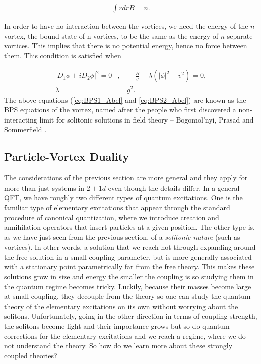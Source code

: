     \begin{align}
        \int r dr B = n.
    \end{align}

    In order to have no interaction between the vortices, we need the energy of the $n$ vortex, the bound state of n vortices, to be the same as the energy of $n$ separate vortices. This implies that there is no potential energy, hence no force between them. This condition is satisfied when

    \begin{align}
        |D_1\phi \pm i D_2 \phi|^2 =0&,  \qquad \frac{B}{g} \pm \lambda \left(|\phi|^2 -v^2  \right) =0, \label{eq:BPS1_Abel}\\
        \lambda &= g^2 .\label{eq:BPS2_Abel}
    \end{align}
    The above equations (\eqref{eq:BPS1_Abel} and \eqref{eq:BPS2_Abel}) are known as the BPS equations of the vortex, named after the people who first discovered a non-interacting limit for solitonic solutions in field theory -- Bogomol'nyi, Prasad and Sommerfield \cite{Bogomolny:1975de} \cite{Prasad:1975kr}.
    

    \subsection{Particle-Vortex Duality}
    The considerations of the previous section are more general and they apply for more than just systems in $2+1d$ even though the details differ. In a general QFT, we have roughly two different types of quantum excitations. One is the familiar type of elementary excitations that appear through the standard procedure of canonical quantization, where we introduce creation and annihilation operators that insert particles at a given position. The other type is, as we have just seen from the previous section, of a \textit{solitonic nature} (such as vortices). In other words, a solution that we reach not through expanding around the free solution in a small coupling parameter, but is more generally associated with a stationary point parametrically far from the free theory. This makes these solutions grow in size and energy the smaller the coupling is so studying them in the quantum regime becomes tricky. Luckily, because their masses become large at small coupling, they decouple from the theory so one can study the quantum theory of the elementary excitations on its own without worrying about the solitons. Unfortunately, going in the other direction in terms of coupling strength, the solitons become light and their importance grows but so do quantum corrections for the elementary excitations and we reach a regime, where we do not understand the theory. So how do we learn more about these strongly coupled theories?

